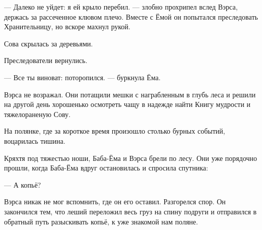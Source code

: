 \documentclass[oneside,final,14pt]{extreport}
\begin{document}
	— Далеко не уйдет: я ей крыло перебил. — злобно прохрипел вслед Вэрса, держась за рассеченное клювом плечо. Вместе с Ёмой он попытался преследовать Хранительницу, но вскоре махнул рукой.
	
	Сова скрылась за деревьями.
	
	Преследователи вернулись.
	
	— Все ты виноват: поторопился. — буркнула Ёма.
	
	Вэрса не возражал. Они потащили мешки с награбленным в глубь леса и решили на другой день хорошенько осмотреть чащу в надежде найти Книгу мудрости и тяжелораненую Сову.
	
	На полянке, где за короткое время произошло столько бурных событий, воцарилась тишина.
	
	Кряхтя под тяжестью ноши, Баба-Ёма и Вэрса брели по лесу. Они уже порядочно прошли, когда Баба-Ёма вдруг остановилась и спросила спутника:
	
	— А копьё?
	
	Вэрса никак не мог вспомнить, где он его оставил. Разгорелся спор. Он закончился тем, что леший переложил весь груз на спину подруги и отправился в обратный путь разыскивать копьё, к уже знакомой нам поляне.
	
	
	
\end{document}
